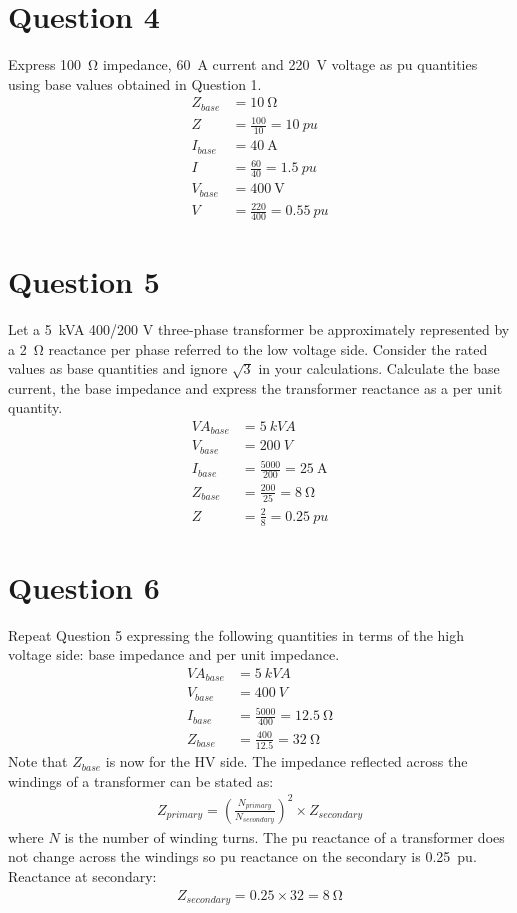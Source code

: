 \section{Question 4}
Express \SI{100}{\ohm} impedance, \SI{60}{\ampere} current and \SI{220}{\volt} voltage as pu quantities using base values obtained in Question 1.
\begin{align}
    Z_{base} &= \SI{10}{\ohm}\\
    Z &= \frac{100}{10} = \SI{10}{pu}\\
    I_{base} &= \SI{40}{\ampere}\\
    I &= \frac{60}{40} = \SI{1.5}{pu}\\
    V_{base} &= \SI{400}{\volt}\\
    V &= \frac{220}{400} = \SI{0.55}{pu}
\end{align}
\section{Question 5}
Let a \SI{5}{kVA} 400/200 V three-phase transformer be approximately represented by a \SI{2}{\ohm} reactance per phase referred to the low voltage side. Consider the rated values as base quantities and ignore $\sqrt{3}$ in your calculations. Calculate the base current, the base impedance and express the transformer reactance as a per unit quantity.
\begin{align}
    VA_{base} &= \SI{5}{kVA}\\
    V_{base} &= \SI{200}{V}\\
    I_{base} &= \frac{5000}{200} = \SI{25}{\ampere}\\
    Z_{base} &= \frac{200}{25} = \SI{8}{\ohm}\\
    Z &= \frac{2}{8} = \SI{0.25}{pu}
\end{align}
\section{Question 6}
Repeat Question 5 expressing the following quantities in terms of the high voltage side: base impedance and per unit impedance.
\begin{align}
    VA_{base} &= \SI{5}{kVA}\\
    V_{base} &= \SI{400}{V}\\
    I_{base} &= \frac{5000}{400} = \SI{12.5}{\ohm}\\
    Z_{base} &= \frac{400}{12.5} = \SI{32}{\ohm}
\end{align}
Note that $Z_{base}$ is now for the HV side. The impedance reflected across the windings of a transformer can be stated as:
\begin{gather}
    Z_{primary} = \left(\frac{N_{primary}}{N_{secondary}}\right)^2\times Z_{secondary}
\end{gather}
where $N$ is the number of winding turns. The pu reactance of a transformer does not change across the windings so pu reactance on the secondary is \SI{0.25}{pu}. Reactance at secondary:
\begin{gather}
    Z_{secondary} = 0.25 \times 32 = \SI{8}{\ohm}
\end{gather}
